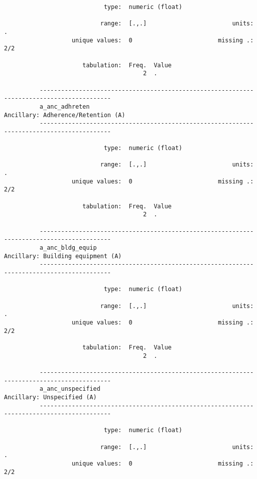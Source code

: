 \documentclass{article}
\begin{document}
\begin{verbatim}
                            type:  numeric (float)
          
                           range:  [.,.]                        units:  .
                   unique values:  0                        missing .:  2/2
          
                      tabulation:  Freq.  Value
                                       2  .
          
          ------------------------------------------------------------------------------------------
          a_anc_adhreten                                          Ancillary: Adherence/Retention (A)
          ------------------------------------------------------------------------------------------
          
                            type:  numeric (float)
          
                           range:  [.,.]                        units:  .
                   unique values:  0                        missing .:  2/2
          
                      tabulation:  Freq.  Value
                                       2  .
          
          ------------------------------------------------------------------------------------------
          a_anc_bldg_equip                                         Ancillary: Building equipment (A)
          ------------------------------------------------------------------------------------------
          
                            type:  numeric (float)
          
                           range:  [.,.]                        units:  .
                   unique values:  0                        missing .:  2/2
          
                      tabulation:  Freq.  Value
                                       2  .
          
          ------------------------------------------------------------------------------------------
          a_anc_unspecified                                               Ancillary: Unspecified (A)
          ------------------------------------------------------------------------------------------
          
                            type:  numeric (float)
          
                           range:  [.,.]                        units:  .
                   unique values:  0                        missing .:  2/2
          

\end{verbatim}
\end{document}
